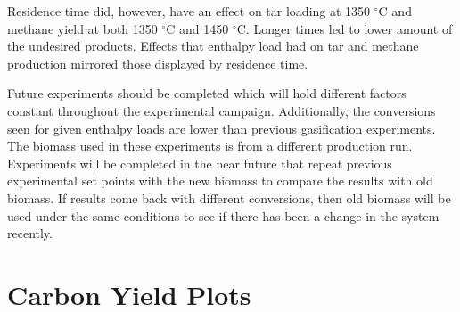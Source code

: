 \documentclass[11pt,twocolumn]{article}
\begin{document}
Residence time did, however, have an effect on tar loading at 1350 $^\circ$C and methane yield at both 1350 $^\circ$C and 1450 $^\circ$C.  Longer times led to lower amount of the undesired products.  Effects that enthalpy load had on tar and methane production mirrored those displayed by residence time.

Future experiments should be completed which will hold different factors constant throughout the experimental campaign.  Additionally, the conversions seen for given enthalpy loads are lower than previous gasification experiments.  The biomass used in these experiments is from a different production run.  Experiments will be completed in the near future that repeat previous experimental set points with the new biomass to compare the results with old biomass.  If results come back with different conversions, then old biomass will be used under the same conditions to see if there has been a change in the system recently.

\onecolumn
\newpage
\appendix

\section{Carbon Yield Plots}
\label{app_plots_cyield}
\end{document}

